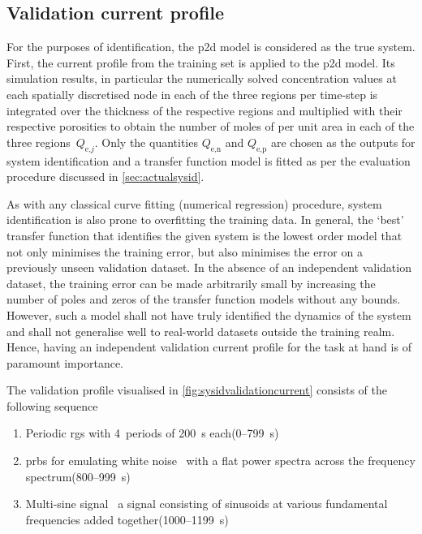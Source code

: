 \subsection{Validation current profile}

For the  purposes of identification,  the \gls{p2d}  model is considered  as the
true system. First, the current profile from  the training set is applied to the
\gls{p2d} model.  Its simulation results,  in particular the  numerically solved
concentration values  at each spatially  discretised node  in each of  the three
regions per time-step is integrated over the thickness of the respective regions
and multiplied with their respective porosities to obtain the number of moles of
 per unit area in each  of the three regions~$Q_{\text{e,}j}$. Only the
quantities  $Q_\text{e,n}$ and  $Q_\text{e,p}$  are chosen  as  the outputs  for
system  identification and  a  transfer  function model  is  fitted  as per  the
evaluation procedure discussed in \cref{sec:actualsysid}.

As with  any classical  curve fitting  (numerical regression)  procedure, system
identification is also  prone to overfitting the training data.  In general, the
`best' transfer  function that identifies the  given system is the  lowest order
model that not  only minimises the training error, but  also minimises the error
on a  previously unseen  validation dataset.  In the  absence of  an independent
validation  dataset,  the  training  error  can be  made  arbitrarily  small  by
increasing the number of poles and zeros of the transfer function models without
any bounds. However,  such a model shall not have  truly identified the dynamics
of the system  and shall not generalise well to  real-world datasets outside the
training realm. Hence, having an  independent validation current profile for the
task at hand is of paramount importance.


The  validation profile visualised in \cref{fig:sysidvalidationcurrent} consists
of the following sequence
\begin{enumerate}
    \item Periodic \gls{rgs} with 4~periods of \SI{200}{\second} each\quad (0--\SI{799}{\second})
    \item \gls{prbs} for emulating white noise \ie~with a flat power spectra
        across the frequency spectrum\quad (800--\SI{999}{\second})
    \item Multi-sine signal \ie~a signal consisting of sinusoids at
        various fundamental frequencies added together\quad (1000--\SI{1199}{\second})
\end{enumerate}

